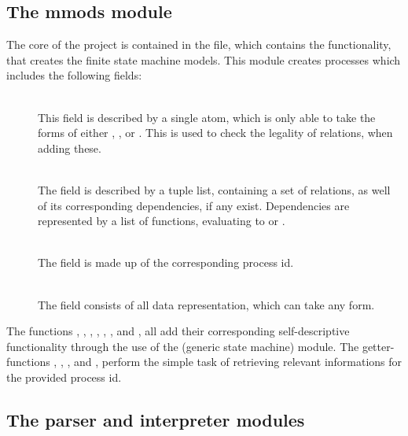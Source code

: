 \subsection{The mmods module}
The core of the project is contained in the  file, which contains the functionality, that creates the finite state machine models. This module creates processes which includes the following fields:
\begin{description}
	\item[]\ \\
		This field is described by a single atom, which is only able to take the forms of either , , or . This is used to check the legality of relations, when adding these.
	\item[]\ \\
		The  field is described by a tuple list, containing a set of relations, as well of its corresponding dependencies, if any exist. Dependencies are represented by a list of functions, evaluating to  or .
	\item[]\ \\
		The  field is made up of the corresponding process id.
	\item[]\ \\
		The  field consists of all data representation, which can take any form.
\end{description}
The functions , , , , , , and , all add their corresponding self-descriptive functionality through the use of the  (generic state machine) module. The getter-functions , , , and , perform the simple task of retrieving relevant informations for the provided process id.
\subsection{The parser and interpreter modules}

